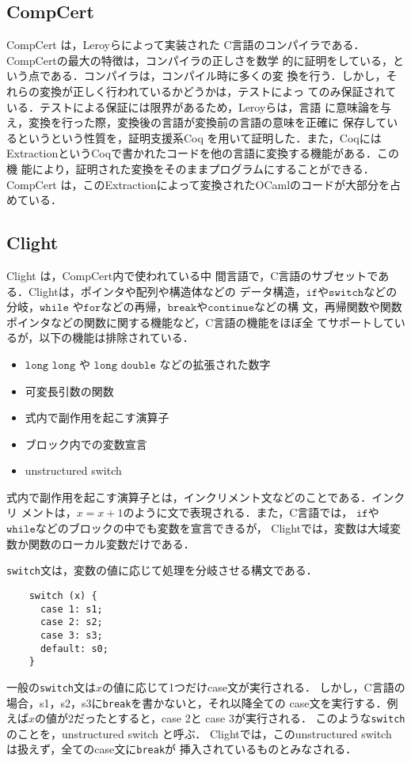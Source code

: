 \subsection{CompCert}
CompCert \cite {DBLP:journals/cacm/Leroy09}は，Leroyらによって実装された
C言語のコンパイラである．CompCertの最大の特徴は，コンパイラの正しさを数学
的に証明をしている，という点である．コンパイラは，コンパイル時に多くの変
換を行う．しかし，それらの変換が正しく行われているかどうかは，テストによっ
てのみ保証されている．テストによる保証には限界があるため，Leroyらは，言語
に意味論を与え，変換を行った際，変換後の言語が変換前の言語の意味を正確に
保存しているというという性質を，証明支援系Coq
\cite{DBLP:series/txtcs/BertotC04} を用いて証明した．また，Coqには
ExtractionというCoqで書かれたコードを他の言語に変換する機能がある．この機
能により，証明された変換をそのままプログラムにすることができる．CompCert
は，このExtractionによって変換されたOCamlのコードが大部分を占めている．
\label{compcert}

\subsection{Clight}
Clight \cite {DBLP:journals/jar/BlazyL09} は，CompCert内で使われている中
間言語で，C言語のサブセットである．Clightは，ポインタや配列や構造体などの
データ構造，$\texttt{if}$や$\texttt{switch}$などの分岐，$\texttt{while}$
や$\texttt{for}$などの再帰，$\texttt{break}$や$\texttt{continue}$などの構
文，再帰関数や関数ポインタなどの関数に関する機能など，C言語の機能をほぼ全
てサポートしているが，以下の機能は排除されている．

\begin{itemize}
  \item $\texttt{long\ long}$ や $\texttt{long\ double}$ などの拡張された数字
  \item 可変長引数の関数
  \item 式内で副作用を起こす演算子
  \item ブロック内での変数宣言
  \item unstructured switch
\end{itemize}

式内で副作用を起こす演算子とは，インクリメント文などのことである．インクリ
メントは，$x = x + 1$のように文で表現される．また，C言語では，
$\texttt{if}$や$\texttt{while}$などのブロックの中でも変数を宣言できるが，
Clightでは，変数は大域変数か関数のローカル変数だけである．

\texttt{switch}文は，変数の値に応じて処理を分岐させる構文である．
\begin{verbatim}
    switch (x) {
      case 1: s1;
      case 2: s2;
      case 3: s3;
      default: s0;
    }
\end{verbatim}
一般の\texttt{switch}文は$x$の値に応じて1つだけcase文が実行される．
しかし，C言語の場合，s1，s2，s3に\texttt{break}を書かないと，それ以降全ての
case文を実行する．例えば$x$の値が$2$だったとすると，case 2と case 3が実行される．
このような\texttt{switch}のことを，unstructured switch と呼ぶ．
Clightでは，このunstructured switch は扱えず，全てのcase文に\texttt{break}が
挿入されているものとみなされる．

\label{clight}